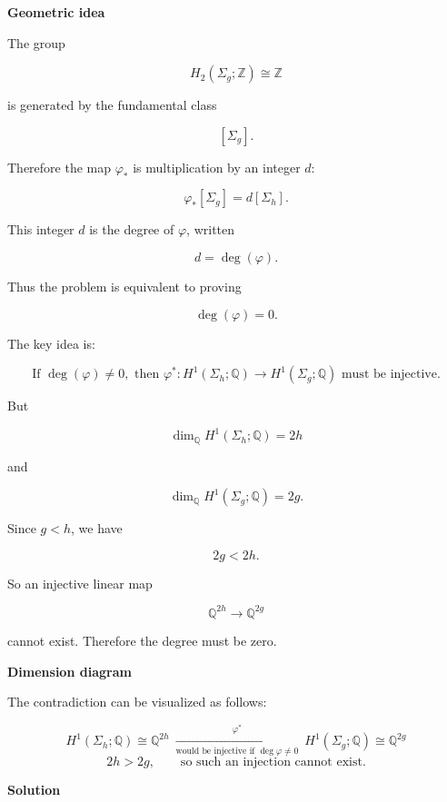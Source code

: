 \begin{solution}

\medskip
\noindent\textbf{Geometric idea}\par
\smallskip


The group

\[
H_2(\Sigma_g;\mathbb Z)\cong \mathbb Z
\]

is generated by the fundamental class

\[
[\Sigma_g].
\]

Therefore the map \(\varphi_*\) is multiplication by an integer \(d\):

\[
\varphi_*[\Sigma_g]=d[\Sigma_h].
\]

This integer \(d\) is the degree of \(\varphi\), written

\[
d=\deg(\varphi).
\]

Thus the problem is equivalent to proving

\[
\deg(\varphi)=0.
\]

The key idea is:

\[
\boxed{
	\text{If }\deg(\varphi)\neq 0,\text{ then }\varphi^*:H^1(\Sigma_h;\mathbb Q)\to H^1(\Sigma_g;\mathbb Q)
	\text{ must be injective.}
}
\]

But

\[
\dim_{\mathbb Q}H^1(\Sigma_h;\mathbb Q)=2h
\]

and

\[
\dim_{\mathbb Q}H^1(\Sigma_g;\mathbb Q)=2g.
\]

Since \(g<h\), we have

\[
2g<2h.
\]

So an injective linear map

\[
\mathbb Q^{2h}\longrightarrow \mathbb Q^{2g}
\]

cannot exist. Therefore the degree must be zero.


\medskip
\noindent\textbf{Dimension diagram}\par
\smallskip


The contradiction can be visualized as follows:



\[
\boxed{
H^1(\Sigma_h;\mathbb Q)\cong\mathbb Q^{2h}
\ \xrightarrow[\text{would be injective if }\deg\varphi\ne0]{\ \varphi^*\ }\
H^1(\Sigma_g;\mathbb Q)\cong\mathbb Q^{2g}}
\]
\[
2h>2g,
\qquad\text{so such an injection cannot exist.}
\]



\medskip
\noindent\textbf{Solution}\par
\smallskip



\end{solution}
